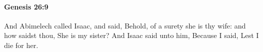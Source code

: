 
		\paragraph{Genesis 26:9} %
			\label{GENESIS-26-9}

			And Abimelech called Isaac, and said, Behold, of a surety she is thy wife: and how saidst thou, She is my sister? And Isaac said unto him, Because I said, Lest I die for her.


